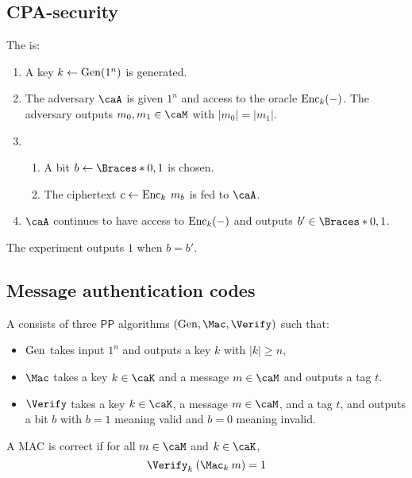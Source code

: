 \documentclass[a5paper]{article}
\begin{document}
\subsection{CPA-security}
\label{subsec:cpa-security}

\begin{definition*}
  The  is:
  \begin{enumerate}%
    \itemsep0em
    \item A key $k\leftarrow\operatorname{Gen}(1^n)$ is generated.
    \item The adversary $\caA$ is given $1^n$ and access to the oracle
      $\operatorname{Enc}_k(-)$. The adversary outputs $m_0,m_1\in\caM$ with $|m_0|=|m_1|$.
    \item
      \begin{enumerate}%
        \itemsep0em
        \item A bit $b\leftarrow \braces{0,1}$ is chosen.
        \item The ciphertext $c\leftarrow\operatorname{Enc}_k\hspace{0.23em} m_b$ is fed to $\caA$.
      \end{enumerate}
    \item $\caA$ continues to have access to $\operatorname{Enc}_k(-)$ and outputs
      $b'\in\braces{0,1}$.
  \end{enumerate}
  The experiment outputs $1$ when $b=b'$.
\end{definition*}

\subsection{Message authentication codes}
\label{subsec:macs}

\begin{definition}
	A  consists of three
  $\mathsf{PP}$ algorithms $(\Gen,\Mac,\Verify)$ such that:
  \begin{itemize}
    \itemsep0em
    \item $\operatorname{Gen}$ takes input $1^n$ and outputs a key $k$ with $|k|\geq n$,
    \item $\Mac$ takes a key $k\in\caK$ and a message $m\in\caM$ and outputs
      a tag $t$.
    \item $\Verify$ takes a key $k\in\caK$, a message $m\in\caM$, and a tag $t$,
      and outputs a bit $b$ with $b=1$ meaning valid and $b=0$ meaning invalid.
  \end{itemize}
  A MAC is correct if for all $m\in\caM$ and $k\in\caK$,
  \begin{equation*}
    \apply{\Verify_k}{(\apply{\Mac_k}{m})} = 1
  \end{equation*}
\end{definition}
\end{document}
